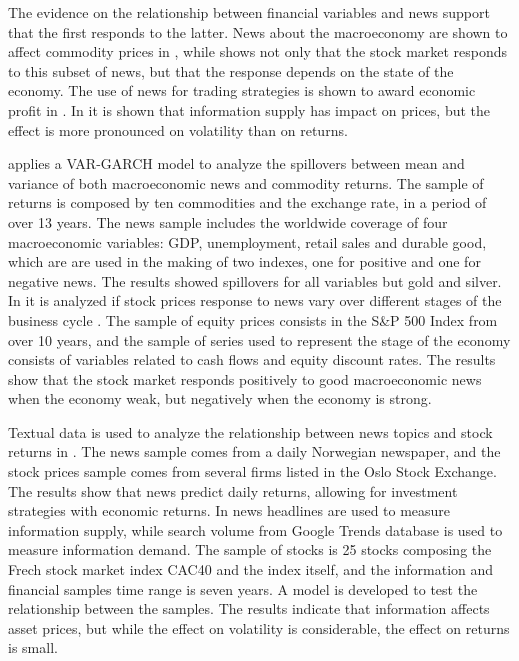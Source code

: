 \documentclass[a4paper]{article}
\begin{document}
The evidence on the relationship between financial variables and news support that the first responds to the latter. News about the macroeconomy are shown to affect commodity prices in 
\citet{caporaleetal2015}, while \citet{macqueenroley1993} shows not only that the stock market responds to this subset of news, but that the response depends on the state of the economy. The use of news for trading strategies is shown to award economic profit in \citet{larsenthorsrud2017}. In \citet{moussaetal2017} it is shown that information supply has impact on prices, but the effect is more pronounced on volatility than on returns.

\citet{caporaleetal2015} applies a VAR-GARCH model to analyze the spillovers between mean and variance of both macroeconomic news and commodity returns. The sample of returns is composed by ten commodities and the exchange rate, in a period of over 13 years. The news sample includes the worldwide coverage of four macroeconomic variables: GDP, unemployment, retail sales and durable good, which are are used in the making of two indexes, one for positive and one for negative news. The results showed spillovers for all variables but gold and silver.
In \citet{macqueenroley1993} it is analyzed if stock prices response to news vary over different stages of the business cycle . The sample of equity prices consists in the S\&P 500 Index from over 10 years, and the sample of series used to represent the stage of the economy consists of variables related to cash flows and equity discount rates. The results show that the stock market responds positively to good macroeconomic news when the economy weak, but negatively when the economy is strong.

Textual data is used to analyze the relationship between news topics and stock returns in \citet{larsenthorsrud2017}. The news sample comes from a daily Norwegian newspaper, and the stock prices sample comes from several firms listed in the Oslo Stock Exchange. The results show that news predict daily returns, allowing for investment strategies with economic returns.
In \citet{moussaetal2017} news headlines are used to measure information supply, while search volume from Google Trends database is used to measure information demand. The sample of stocks is 25 stocks composing the Frech stock market index CAC40 and the index itself, and the information and financial samples time range is seven years. A model is developed to test the relationship between the samples. The results indicate that information affects asset prices, but while the effect on volatility is considerable, the effect on returns is small.
\end{document}
